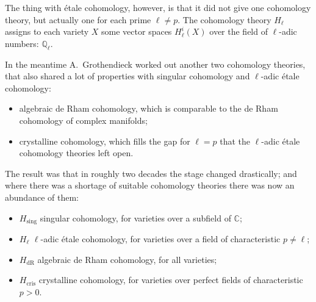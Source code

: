 \documentclass[a4paper,10pt]{article}
\begin{document}
The thing with \'{e}tale cohomology, however, is that it did not give one
cohomology theory, but actually one for each prime $\ell \ne p$. The cohomology
theory $H_{\ell}$ assigns to each variety $X$ some vector spaces
$H_{\ell}^{i}(X)$ over the field of $\ell$-adic numbers: $\mathbb{Q}_{\ell}$.

In the meantime A.~Grothendieck worked out another two cohomology theories,
that also shared a lot of properties with singular cohomology and $\ell$-adic
\'{e}tale cohomology:
\begin{itemize} %
	\item algebraic de Rham cohomology, which is comparable to the de Rham
		cohomology of complex manifolds;
	\item crystalline cohomology, which fills the gap for $\ell = p$ that
		the $\ell$-adic \'{e}tale cohomology theories left open.
\end{itemize} %
The result was that in roughly two decades the stage changed drastically; and
where there was a shortage of suitable cohomology theories there was now an
abundance of them:
\begin{itemize} %
	\item $H_{\mathrm{sing}}$ singular cohomology, for varieties over a
		subfield of $\mathbb{C}$;
	\item $H_{\ell}$ $\ell$-adic \'{e}tale cohomology, for varieties over a
		field of characteristic $p \ne \ell$;
	\item $H_{\mathrm{dR}}$ algebraic de Rham cohomology, for all
		varieties;
	\item $H_{\mathrm{cris}}$ crystalline cohomology, for varieties over
		perfect fields of characteristic $p > 0$.
\end{itemize} %



\end{document}

